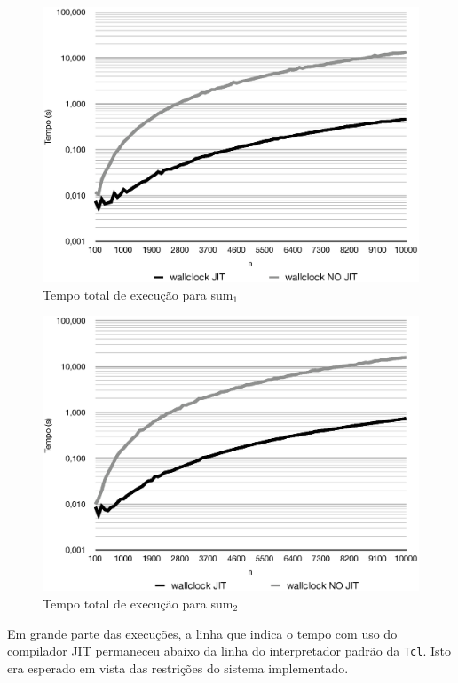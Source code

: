 \begin{figure}[ht!]
  \centering
  \includegraphics[scale=0.70]{figs/sum1_tempo}
  \caption{Tempo total de execução para sum$_1$ \label{fig:sum1-tempo}}
\end{figure}
\begin{figure}[ht!]
  \centering
  \includegraphics[scale=0.70]{figs/sum2_tempo}
  \caption{Tempo total de execução para sum$_2$ \label{fig:sum2-tempo}}
\end{figure}

Em grande parte das execuções, a linha que indica o tempo com uso
do compilador JIT permaneceu abaixo da linha do interpretador padrão da
\texttt{Tcl}. Isto era esperado em vista das restrições do sistema
implementado.

